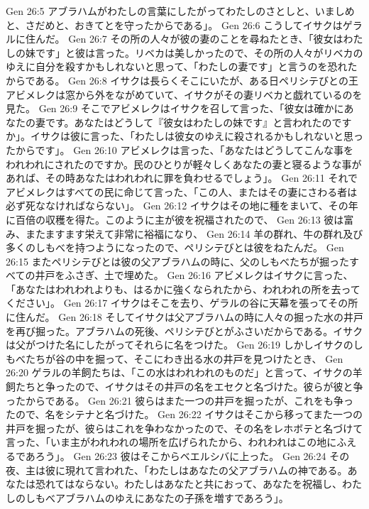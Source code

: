 Gen 26:5  アブラハムがわたしの言葉にしたがってわたしのさとしと、いましめと、さだめと、おきてとを守ったからである」。
Gen 26:6  こうしてイサクはゲラルに住んだ。
Gen 26:7  その所の人々が彼の妻のことを尋ねたとき、「彼女はわたしの妹です」と彼は言った。リベカは美しかったので、その所の人々がリベカのゆえに自分を殺すかもしれないと思って、「わたしの妻です」と言うのを恐れたからである。
Gen 26:8  イサクは長らくそこにいたが、ある日ペリシテびとの王アビメレクは窓から外をながめていて、イサクがその妻リベカと戯れているのを見た。
Gen 26:9  そこでアビメレクはイサクを召して言った、「彼女は確かにあなたの妻です。あなたはどうして『彼女はわたしの妹です』と言われたのですか」。イサクは彼に言った、「わたしは彼女のゆえに殺されるかもしれないと思ったからです」。
Gen 26:10  アビメレクは言った、「あなたはどうしてこんな事をわれわれにされたのですか。民のひとりが軽々しくあなたの妻と寝るような事があれば、その時あなたはわれわれに罪を負わせるでしょう」。
Gen 26:11  それでアビメレクはすべての民に命じて言った、「この人、またはその妻にさわる者は必ず死ななければならない」。
Gen 26:12  イサクはその地に種をまいて、その年に百倍の収穫を得た。このように主が彼を祝福されたので、
Gen 26:13  彼は富み、またますます栄えて非常に裕福になり、
Gen 26:14  羊の群れ、牛の群れ及び多くのしもべを持つようになったので、ペリシテびとは彼をねたんだ。
Gen 26:15  またペリシテびとは彼の父アブラハムの時に、父のしもべたちが掘ったすべての井戸をふさぎ、土で埋めた。
Gen 26:16  アビメレクはイサクに言った、「あなたはわれわれよりも、はるかに強くなられたから、われわれの所を去ってください」。
Gen 26:17  イサクはそこを去り、ゲラルの谷に天幕を張ってその所に住んだ。
Gen 26:18  そしてイサクは父アブラハムの時に人々の掘った水の井戸を再び掘った。アブラハムの死後、ペリシテびとがふさいだからである。イサクは父がつけた名にしたがってそれらに名をつけた。
Gen 26:19  しかしイサクのしもべたちが谷の中を掘って、そこにわき出る水の井戸を見つけたとき、
Gen 26:20  ゲラルの羊飼たちは、「この水はわれわれのものだ」と言って、イサクの羊飼たちと争ったので、イサクはその井戸の名をエセクと名づけた。彼らが彼と争ったからである。
Gen 26:21  彼らはまた一つの井戸を掘ったが、これをも争ったので、名をシテナと名づけた。
Gen 26:22  イサクはそこから移ってまた一つの井戸を掘ったが、彼らはこれを争わなかったので、その名をレホボテと名づけて言った、「いま主がわれわれの場所を広げられたから、われわれはこの地にふえるであろう」。
Gen 26:23  彼はそこからベエルシバに上った。
Gen 26:24  その夜、主は彼に現れて言われた、「わたしはあなたの父アブラハムの神である。あなたは恐れてはならない。わたしはあなたと共におって、あなたを祝福し、わたしのしもべアブラハムのゆえにあなたの子孫を増すであろう」。
